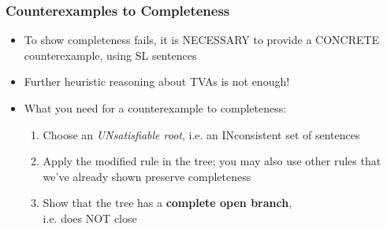 \begin{frame}
\frametitle{Counterexamples to Completeness}

\begin{itemize}[<+->]

\item To show completeness fails, it is NECESSARY to provide a CONCRETE counterexample, using SL sentences

\bi

\item Further heuristic reasoning about TVAs is not enough!

\ei

\bigskip

\item What you need for a counterexample to completeness:

\begin{enumerate}[1.)]

\item Choose an \emph{UNsatisfiable root}, i.e. an INconsistent set of sentences

\item Apply the modified rule in the tree; you may also use other rules that we've already shown preserve completeness

\item Show that the tree has a \textbf{\textcolor{OGlyallpink}{complete open branch}}, \\ i.e. does NOT close

\end{enumerate}

\end{itemize}
\end{frame}

